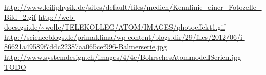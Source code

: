 \documentclass[pdftex, a4paper,11pt, twoside, ngerman]{report}
\begin{document}
  \begin{thebibliography}{99}
    \scriptsize
    \url{http://www.leifiphysik.de/sites/default/files/medien/Kennlinie_einer_Fotozelle_Bild_2.gif}
    \url{http://web-docs.gsi.de/~wolle/TELEKOLLEG/ATOM/IMAGES/photoeffekt1.gif}
    \url{http://scienceblogs.de/primaklima/wp-content/blogs.dir/29/files/2012/06/i-86621a49589f7ddc22387aa065cef996-Balmerserie.jpg}
    \url{http://www.systemdesign.ch/images/4/4e/BohrschesAtommodellSerien.jpg}
     \url{TODO}
    
  \end{thebibliography}
  
\end{document}
